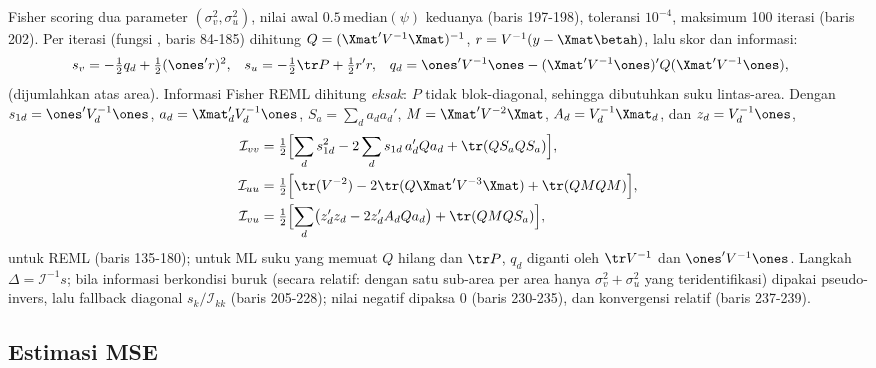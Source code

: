Fisher scoring dua parameter $(\sigma_v^2,\sigma_u^2)$, nilai awal
$0.5\,\mathrm{median}(\psi)$ keduanya (baris 197-198), toleransi $10^{-4}$,
maksimum 100 iterasi (baris 202). Per iterasi (fungsi ,
baris 84-185) dihitung $Q=(\Xmat'V^{-1}\Xmat)^{-1}$, $r=V^{-1}(y-\Xmat\betah)$,
lalu skor dan informasi:
\begin{align}
  s_v&=-\tfrac12 q_d+\tfrac12(\ones'r)^2,
    & s_u&=-\tfrac12\tr P+\tfrac12 r'r,
    & q_d&=\ones'V^{-1}\ones-(\Xmat'V^{-1}\ones)'Q(\Xmat'V^{-1}\ones),
    \label{eq:tf-score-reml}
\end{align}
(dijumlahkan atas area). Informasi Fisher REML dihitung \emph{eksak}: $P$
tidak blok-diagonal, sehingga dibutuhkan suku lintas-area. Dengan
$s_{1d}=\ones'V_d^{-1}\ones$, $a_d=\Xmat_d'V_d^{-1}\ones$,
$S_a=\sum_d a_da_d'$, $M=\Xmat'V^{-2}\Xmat$, $A_d=V_d^{-1}\Xmat_d$, dan
$z_d=V_d^{-1}\ones$,
\begin{align}
  \mathcal I_{vv}&=\tfrac12\Bigl[\sum_d s_{1d}^2-2\sum_d s_{1d}\,a_d'Qa_d
    +\tr(QS_aQS_a)\Bigr],\notag\\
  \mathcal I_{uu}&=\tfrac12\Bigl[\tr(V^{-2})-2\tr(Q\Xmat'V^{-3}\Xmat)
    +\tr(QMQM)\Bigr],
  \label{eq:tf-info-reml}\\
  \mathcal I_{vu}&=\tfrac12\Bigl[\sum_d\bigl(z_d'z_d-2z_d'A_dQa_d\bigr)
    +\tr(QMQS_a)\Bigr],\notag
\end{align}
untuk REML (baris 135-180); untuk ML suku yang memuat $Q$ hilang dan
$\tr P$, $q_d$ diganti oleh $\tr V^{-1}$ dan $\ones'V^{-1}\ones$. Langkah
$\Delta=\mathcal I^{-1}s$; bila informasi berkondisi buruk (secara relatif:
dengan satu sub-area per area hanya $\sigma_v^2+\sigma_u^2$ yang
teridentifikasi) dipakai pseudo-invers, lalu fallback diagonal
$s_k/\mathcal I_{kk}$ (baris 205-228); nilai negatif dipaksa $0$ (baris
230-235), dan konvergensi relatif (baris 237-239).


\subsection{Estimasi MSE}\label{sec:twofold-mse}

